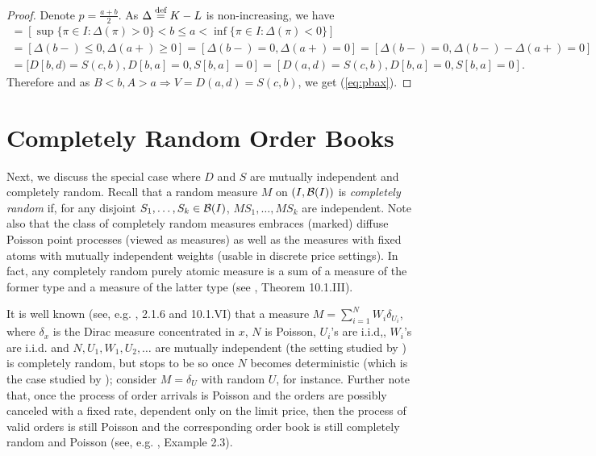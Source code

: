 \documentclass{aptpub}
\begin{document}
\begin{proof} Denote $p = \frac{a+b}2$. As $\Delta \stackrel{\text{def}}{=} K-L$ is non-increasing, we have
\begin{multline*}
[B < b,A > a] = [\sup\{\pi\in I:\Delta(\pi)>0\} < b \leq a < \inf\{\pi\in I:\Delta(\pi)< 0 \} ]
\\= [\Delta(b-)\leq 0,\Delta(a+)\geq 0] = [\Delta(b-) = 0,\Delta(a+) = 0]
= [\Delta(b-)=0, \Delta(b-)-\Delta(a+)=0]
\\=[D[b,d)=S(c,b), D[b,a] = 0, S[b,a] = 0]
=[ D(a,d)=S(c,b), D[b,a] = 0, S[b,a] = 0].
\end{multline*}
Therefore and as $B<b,A>a \Rightarrow V=D(a,d)=S(c,b)$, we get (\ref{eq:pbax}).

\end{proof}



\section{Completely Random Order Books}
\label{sec:cr}

Next, we discuss the special case where $D$ and $S$ are mutually independent and completely random. Recall that a random measure $M$ on $(I, \mathcal{B}(I))$ is {\em completely random} if, for any disjoint $S_1,\dots,S_k\in \mathcal{B}(I)$, $MS_1,\dots,MS_k$ are independent. Note also that the class of completely random measures embraces (marked) diffuse Poisson point processes (viewed as measures) as well as the measures with fixed atoms with mutually independent weights (usable in discrete price settings). In fact, any completely random purely atomic measure is a sum of a measure of the former type and a measure of the latter type (see \cite{daley03}, Theorem 10.1.III). 

It is well known (see, e.g. \cite{daley03}, 2.1.6 and 10.1.VI) that a measure $M=\sum_{i=1}^N W_i \delta_{U_i}$, where $\delta_x$ is the Dirac measure concentrated in $x$, $N$ is Poisson, $U_i$'s are i.i.d,, $W_i$'s are i.i.d. and $N,U_1,W_1,U_2,\dots$ are mutually independent (the setting studied by \cite{toke2015exact}) is completely random, but stops to be so once $N$ becomes deterministic (which is the case studied by \cite{derksen2020clearing}); consider $M=\delta_U$ with random $U$, for instance. Further note that, once the process of order arrivals is Poisson and the orders are possibly canceled with a fixed rate, dependent only on the limit price, then the process of valid orders is still Poisson and the corresponding order book is still completely random and Poisson (see, e.g. \cite{smid16estimation}, Example 2.3).
\end{document}
